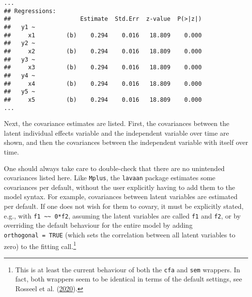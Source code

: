 \documentclass[
  12pt,
  a4paper]{article}
\begin{document}
\singlespacing

\begin{verbatim}
...
## Regressions:
##                    Estimate  Std.Err  z-value  P(>|z|)
##   y1 ~                                                
##     x1         (b)    0.294    0.016   18.809    0.000
##   y2 ~                                                
##     x2         (b)    0.294    0.016   18.809    0.000
##   y3 ~                                                
##     x3         (b)    0.294    0.016   18.809    0.000
##   y4 ~                                                
##     x4         (b)    0.294    0.016   18.809    0.000
##   y5 ~                                                
##     x5         (b)    0.294    0.016   18.809    0.000
...
\end{verbatim}

\doublespacing

Next, the covariance estimates are listed. First, the covariances
between the latent individual effects variable and the independent
variable over time are shown, and then the covariances between the
independent variable with itself over time.

One should always take care to double-check that there are no unintended
covariances listed here. Like \texttt{Mplus}, the \texttt{lavaan}
package estimates some covariances per default, without the user
explicitly having to add them to the model syntax. For example,
covariances between latent variables are estimated per default. If one
does not wish for them to covary, it must be explicitly stated, e.g.,
with \texttt{f1\ \textasciitilde{}\textasciitilde{}\ 0*f2}, assuming the
latent variables are called \texttt{f1} and \texttt{f2}, or by
overriding the default behaviour for the entire model by adding
\texttt{orthogonal\ =\ TRUE} (which sets the correlation between all
latent variables to zero) to the fitting call.\footnote{This is at least
  the current behaviour of both the \texttt{cfa} and \texttt{sem}
  wrappers. In fact, both wrappers seem to be identical in terms of the
  default settings, see Rosseel et al.
  (\protect\hyperlink{ref-Rosseel2020}{2020}).}

\singlespacing
\end{document}

